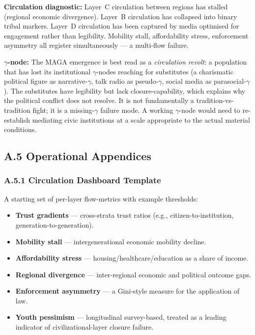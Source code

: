 \documentclass[
]{article}
\providecommand{\tightlist}{%
  \setlength{\itemsep}{0pt}\setlength{\parskip}{0pt}}
\begin{document}
\textbf{Circulation diagnostic:} Layer~C circulation between regions
has stalled (regional economic divergence). Layer~B circulation has
collapsed into binary tribal markers. Layer~D circulation has been
captured by media optimised for engagement rather than legibility.
Mobility stall, affordability stress, enforcement asymmetry all
register simultaneously --- a multi-flow failure.

\textbf{\(\gamma\)-node:} The MAGA emergence is best read as a
\textit{circulation revolt}: a population that has lost its
institutional \(\gamma\)-nodes reaching for substitutes (a charismatic
political figure as narrative-\(\gamma\), talk radio as
pseudo-\(\gamma\), social media as parasocial-\(\gamma\)). The
substitutes have legibility but lack closure-capability, which
explains why the political conflict does not resolve. It is not
fundamentally a tradition-vs-tradition fight; it is a missing-\(\gamma\)
failure mode. A working \(\gamma\)-node would need to re-establish
mediating civic institutions at a scale appropriate to the actual
material conditions.

\subsection{A.5 Operational
Appendices}\label{appendix-a-appendices}

\subsubsection*{A.5.1 Circulation Dashboard Template}

A starting set of per-layer flow-metrics with example thresholds:

\begin{itemize}
\tightlist
\item
  \textbf{Trust gradients} --- cross-strata trust ratios (e.g.,
  citizen-to-institution, generation-to-generation).
\item
  \textbf{Mobility stall} --- intergenerational economic mobility
  decline.
\item
  \textbf{Affordability stress} --- housing/healthcare/education as a
  share of income.
\item
  \textbf{Regional divergence} --- inter-regional economic and
  political outcome gaps.
\item
  \textbf{Enforcement asymmetry} --- a Gini-style measure for the
  application of law.
\item
  \textbf{Youth pessimism} --- longitudinal survey-based, treated as a
  leading indicator of civilizational-layer closure failure.
\end{itemize}
\end{document}

